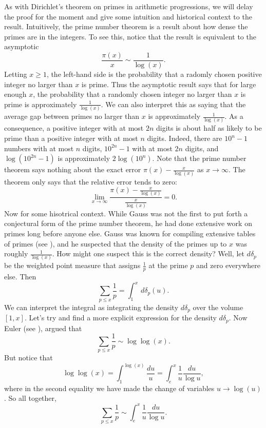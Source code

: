 \documentclass[12pt]{book}
\theoremstyle{definition}\newframedtheorem{method}{Method}
\renewcommand{\d}{\delta}
\newcommand{\<}{\langle}
\renewcommand{\>}{\rangle}
\begin{document}
      As with Dirichlet's theorem on primes in arithmetic progressions, we will delay the proof for the moment and give some intuition and historical context to the result. Intuitively, the prime number theorem is a result about how dense the primes are in the integers. To see this, notice that the result is equivalent to the asymptotic
      \[
        \frac{\pi(x)}{x} \sim \frac{1}{\log(x)}.
      \]
      Letting $x \ge 1$, the left-hand side is the probability that a radomly chosen positive integer no larger than $x$ is prime. Thus the asymptotic result says that for large enough $x$, the probability that a randomly chosen integer no larger than $x$ is prime is approximately $\frac{1}{\log(x)}$. We can also interpret this as saying that the average gap between primes no larger than $x$ is approximately $\frac{1}{\log(x)}$. As a consequence, a positive integer with at most $2n$ digits is about half as likely to be prime than a positive integer with at most $n$ digits. Indeed, there are $10^{n}-1$ numbers with at most $n$ digits, $10^{2n}-1$ with at most $2n$ digits, and $\log(10^{2n}-1)$ is approximately $2\log(10^{n})$. Note that the prime number theorem says nothing about the exact error $\pi(x)-\frac{x}{\log(x)}$ as $x \to \infty$. The theorem only says that the relative error tends to zero:
      \[
        \lim_{x \to \infty}\frac{\pi(x)-\frac{x}{\log(x)}}{\frac{x}{\log(x)}} = 0.
      \]
      Now for some hisotrical context. While Gauss was not the first to put forth a conjectural form of the prime number theorem, he had done extensive work on primes long before anyone else. Gauss was known for compiling extensive tables of primes (see \cite{gauss1872tafel}), and he suspected that the density of the primes up to $x$ was roughly $\frac{1}{\log(x)}$. How might one suspect this is the correct density? Well, let $d\d_{p}$ be the weighted point measure that assigns $\frac{1}{p}$ at the prime $p$ and zero everywhere else. Then
      \[
        \sum_{p \le x}\frac{1}{p} = \int_{1}^{x}\,d\d_{p}(u).
      \]
      We can interpret the integral as integrating the density $d\d_{p}$ over the volume $[1,x]$. Let's try and find a more explicit expression for the density $d\d_{p}$. Now Euler (see \cite{euler1737variae}), argued that
      \[
        \sum_{p \le x}\frac{1}{p} \sim \log\log(x).
      \]
      But notice that
      \[
        \log\log(x) = \int_{1}^{\log(x)}\frac{du}{u} = \int_{e}^{x}\frac{1}{u}\frac{du}{\log{u}},
      \]
      where in the second equality we have made the change of variables $u \to \log(u)$. So all together,
      \[
        \sum_{p \le x}\frac{1}{p} \sim \int_{e}^{x}\frac{1}{u}\frac{du}{\log{u}}.
      \]
\end{document}
